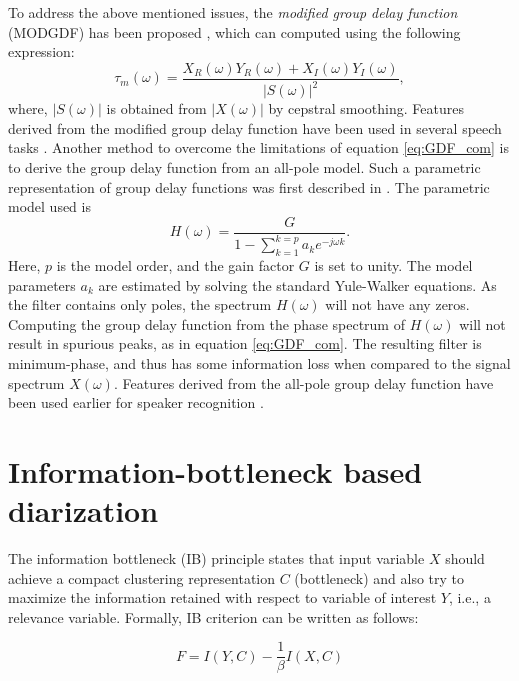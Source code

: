 \documentclass[conference]{IEEEtran}
\begin{document}
To address the above mentioned issues, the
\textit{modified group delay function} (MODGDF) has been proposed
\cite{modifiedGD}, which can
computed using the following expression:
\begin{equation}
\tau_{m}(\omega) =  
\frac{X_R(\omega)Y_R(\omega) + X_I(\omega)Y_I(\omega)}{|S(\omega)|^2}, 
\label{eq:MODGDF}
\end{equation}
where, $|S(\omega)|$ is obtained from $|X(\omega)|$ by cepstral smoothing.
Features derived from the modified group delay function have been used in
several speech tasks \cite{modifiedGD}.
Another method to overcome the limitations of equation \ref{eq:GDF_com} is to
derive the group delay function from an all-pole model. Such a parametric
representation of group delay functions was first described in \cite{yegnaJASA}.
The parametric model used is
\begin{equation}
H(\omega) =  \frac{G}{1 - \sum_{k=1}^{k = p} a_k e^{-j\omega k}}.
\label{eq:homega}
\end{equation}
Here, $p$ is the model order, and the gain factor $G$ is set to unity. The
model parameters $a_k$ are estimated by solving the standard Yule-Walker
equations. As the filter contains only poles, the spectrum $H(\omega)$ will not have any zeros.
Computing the group delay function from the phase spectrum of $H(\omega)$ will
not result in spurious peaks, as in equation \ref{eq:GDF_com}. The resulting
filter is minimum-phase, and thus has some information loss when compared to the
signal spectrum $X(\omega)$. Features derived from the all-pole group delay
function have been used earlier for speaker recognition \cite{allPoleGdSid}.

\section{Information-bottleneck based diarization}
\label{system}


The information bottleneck (IB) principle states that input variable $X$ should achieve a compact
clustering representation $C$ (bottleneck) and also try to maximize the
information retained with respect to variable of interest $Y$, i.e., a relevance
variable. Formally, IB criterion can be written as follows:

\begin{equation}
\label{eq:aIB}
F = I(Y,C) - \frac{1}{\beta}I(X,C) 
\end{equation} 
\end{document}
